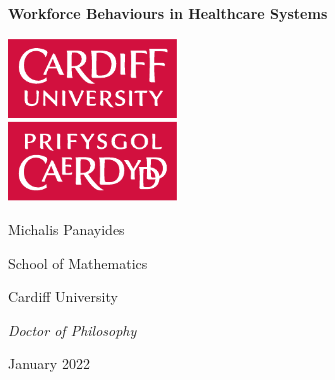 \begin{alwayssingle}
    \thispagestyle{empty}
  \null\vfill
  \begin{center}
    { \Huge {\bfseries {Workforce Behaviours in Healthcare Systems}} \par}
{\large \vspace*{35mm} {\includegraphics[width=45mm]{Cardifflogo.pdf} \par} \vspace*{25mm}}
    {{\Large Michalis Panayides} \par}
{\large \vspace*{1ex}
    {{School of Mathematics} \par}
\vspace*{1ex}
    {Cardiff University \par}
\vspace*{25mm}
    {{\submittedtext} \par}
\vspace*{1ex}
    {\it {Doctor of Philosophy} \par}
\vspace*{2ex}
    {January 2022}}
  \end{center}
  \null\vfill
\end{alwayssingle}
